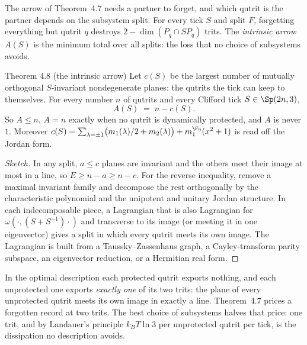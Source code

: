 The arrow of Theorem~4.7 needs a partner to forget, and which qutrit is the partner depends on the subsystem split. For
every tick $S$ and split $F$, forgetting everything but qutrit $q$ destroys $2-\dim(P_q\cap SP_q)$ trits. The
\emph{intrinsic arrow} $A(S)$ is the minimum total over all splits: the loss that no choice of subsystems avoids.

\begin{result}{Theorem 4.8 (the intrinsic arrow) \hfill \tierT}
Let $c(S)$ be the largest number of mutually orthogonal $S$-invariant nondegenerate planes: the qutrits the tick can
keep to themselves. For every number $n$ of qutrits and every Clifford tick $S\in\Sp(2n,3)$,
\[
A(S)\;=\;n-c(S).
\]
So $A\le n$, $A=n$ exactly when no qutrit is dynamically protected, and $A$ is never $1$. Moreover
$c(S)=\sum_{\lambda=\pm1}\bigl(m_1(\lambda)/2+m_2(\lambda)\bigr)+m_1^{\F_9}(x^2+1)$ is read off the Jordan form.
\end{result}

\begin{proof}[Sketch]
In any split, $a\le c$ planes are invariant and the others meet their image at most in a line, so $E\ge n-a\ge n-c$.
For the reverse inequality, remove a maximal invariant family and decompose the rest orthogonally by the
characteristic polynomial and the unipotent and unitary Jordan structure. In each indecomposable piece, a Lagrangian
that is also Lagrangian for $\omega(\cdot,(S+S^{-1})\cdot)$ and transverse to its image (or meeting it in one
eigenvector) gives a split in which every qutrit meets its own image. The Lagrangian is built from a
Taussky--Zassenhaus graph, a Cayley-transform parity subspace, an eigenvector reduction, or a Hermitian real form.
\end{proof}

In the optimal description each protected qutrit exports nothing, and each unprotected one exports \emph{exactly one}
of its two trits: the plane of every unprotected qutrit meets its own image in exactly a line. Theorem~4.7 prices a
forgotten record at two trits. The best choice of subsystems halves that price: one trit, and by Landauer's principle
$k_BT\ln3$ per unprotected qutrit per tick, is the dissipation no description avoids. \tierB

